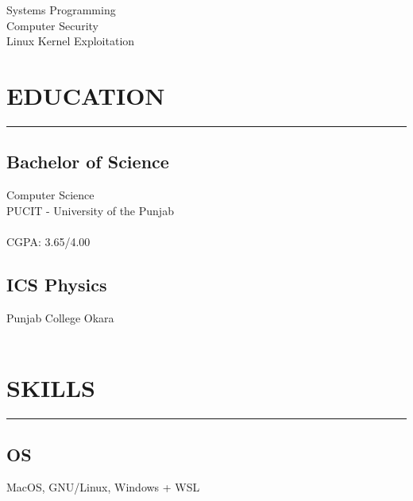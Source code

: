 \documentclass[]{resume}
\begin{document}
%
%

\begin{minipage}[t]{0.33\textwidth}

    \begin{large}
        \\
    \end{large}

    \vspace{4pt}
    \noindent {}\\
    Systems Programming\\
    Computer Security\\
    Linux Kernel Exploitation



    \section{EDUCATION}
    \noindent\rule{5cm}{0.4pt}

    \subsection{Bachelor of Science}
    \noindent Computer Science\\
    PUCIT - University of the Punjab\\
    \\
    CGPA: 3.65/4.00

    \vspace{8pt}
    \subsection{ICS Physics}
    \noindent Punjab College Okara\\
    \\


    \section{SKILLS}
    \noindent\rule{5cm}{0.4pt}

    \subsection{OS}
    \noindent MacOS, GNU/Linux, Windows + WSL


\end{minipage}
\end{document}
